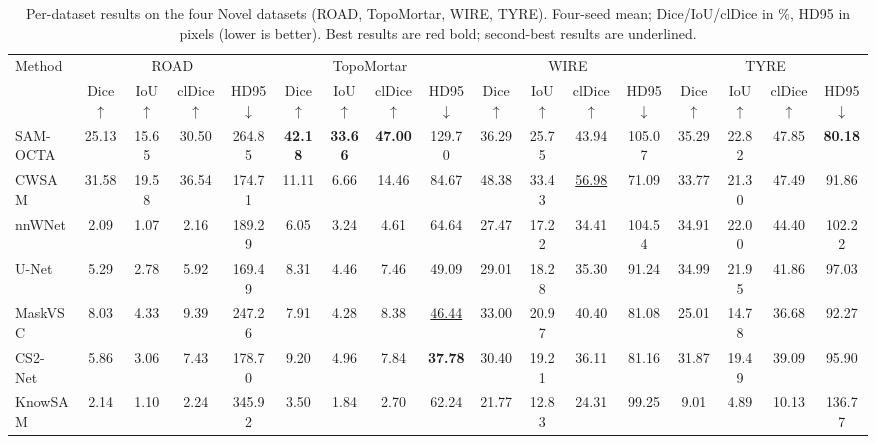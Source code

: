 \begin{table}[t]
\centering
\caption{Per-dataset results on the four Novel datasets (ROAD, TopoMortar, WIRE, TYRE). Four-seed mean; Dice/IoU/clDice in \%, HD95 in pixels (lower is better). Best results are red bold; second-best results are underlined.}
\label{tab:per_dataset_novel}
\tiny
\setlength{\tabcolsep}{1.5pt}
\begin{tabular*}{\textwidth}{@{\extracolsep{\fill}}lcccccccccccccccc@{}}
\toprule
Method & \multicolumn{4}{c}{ROAD~\cite{mnih2013machine}} & \multicolumn{4}{c}{TopoMortar~\cite{valverde2025topomortar}} & \multicolumn{4}{c}{WIRE~\cite{zhu2026sacm}} & \multicolumn{4}{c}{TYRE~\cite{zhu2026sacm}} \\
\cmidrule(lr){2-5}
\cmidrule(lr){6-9}
\cmidrule(lr){10-13}
\cmidrule(lr){14-17}
 & Dice $\uparrow$ & IoU $\uparrow$ & clDice $\uparrow$ & HD95 $\downarrow$ & Dice $\uparrow$ & IoU $\uparrow$ & clDice $\uparrow$ & HD95 $\downarrow$ & Dice $\uparrow$ & IoU $\uparrow$ & clDice $\uparrow$ & HD95 $\downarrow$ & Dice $\uparrow$ & IoU $\uparrow$ & clDice $\uparrow$ & HD95 $\downarrow$ \\
\midrule
SAM-OCTA~\cite{wang2024sam_octa} & 25.13 & 15.65 & 30.50 & 264.85 & \textcolor{red!80!black}{\textbf{42.18}} & \textcolor{red!80!black}{\textbf{33.66}} & \textcolor{red!80!black}{\textbf{47.00}} & 129.70 & 36.29 & 25.75 & 43.94 & 105.07 & 35.29 & 22.82 & 47.85 & \textcolor{red!80!black}{\textbf{80.18}} \\
CWSAM~\cite{pu2025cwsam} & 31.58 & 19.58 & 36.54 & 174.71 & 11.11 & 6.66 & 14.46 & 84.67 & 48.38 & 33.43 & \underline{56.98} & 71.09 & 33.77 & 21.30 & 47.49 & 91.86 \\
nnWNet~\cite{zhou2025nnwnet} & 2.09 & 1.07 & 2.16 & 189.29 & 6.05 & 3.24 & 4.61 & 64.64 & 27.47 & 17.22 & 34.41 & 104.54 & 34.91 & 22.00 & 44.40 & 102.22 \\
U-Net~\cite{ronneberger2015unet} & 5.29 & 2.78 & 5.92 & 169.49 & 8.31 & 4.46 & 7.46 & 49.09 & 29.01 & 18.28 & 35.30 & 91.24 & 34.99 & 21.95 & 41.86 & 97.03 \\
MaskVSC~\cite{zhou2025maskvsc} & 8.03 & 4.33 & 9.39 & 247.26 & 7.91 & 4.28 & 8.38 & \underline{46.44} & 33.00 & 20.97 & 40.40 & 81.08 & 25.01 & 14.78 & 36.68 & 92.27 \\
CS2-Net~\cite{mou2021cs2net} & 5.86 & 3.06 & 7.43 & 178.70 & 9.20 & 4.96 & 7.84 & \textcolor{red!80!black}{\textbf{37.78}} & 30.40 & 19.21 & 36.11 & 81.16 & 31.87 & 19.49 & 39.09 & 95.90 \\
KnowSAM~\cite{huang2025knowsam} & 2.14 & 1.10 & 2.24 & 345.92 & 3.50 & 1.84 & 2.70 & 62.24 & 21.77 & 12.83 & 24.31 & 99.25 & 9.01 & 4.89 & 10.13 & 136.77 \\

\end{tabular*}
\end{table}
